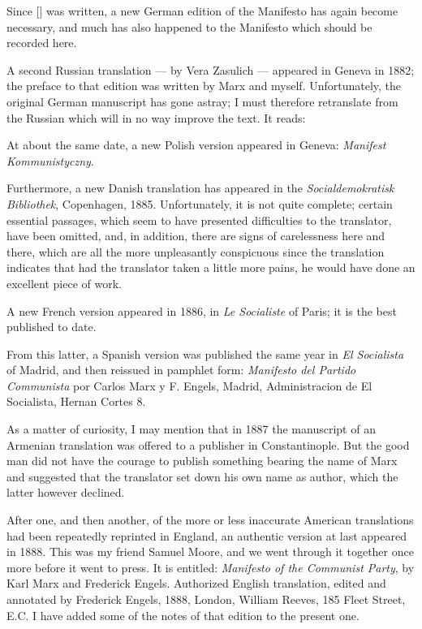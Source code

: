 Since [] was written, a new German edition of the Manifesto has again become necessary, and much has also happened to the Manifesto which should be recorded here. 

A second Russian translation --- by Vera Zasulich --- appeared in Geneva in 1882; the preface to that edition was written by Marx and myself. Unfortunately, the original German manuscript has gone astray; I must therefore retranslate from the Russian which will in no way improve the text. It reads: 
\begin{displayquote}
\end{displayquote}
At about the same date, a new Polish version appeared in Geneva: \emph{Manifest Kommunistyczny}. 

Furthermore, a new Danish translation has appeared in the \emph{Socialdemokratisk Bibliothek}, Copenhagen, 1885. Unfortunately, it is not quite complete; certain essential passages, which seem to have presented difficulties to the translator, have been omitted, and, in addition, there are signs of carelessness here and there, which are all the more unpleasantly conspicuous since the translation indicates that had the translator taken a little more pains, he would have done an excellent piece of work. 

A new French version appeared in 1886, in \emph{Le Socialiste} of Paris; it is the best published to date. 

From this latter, a Spanish version was published the same year in \emph{El Socialista} of Madrid, and then reissued in pamphlet form: \emph{Manifesto del Partido Communista} por Carlos Marx y F. Engels, Madrid, Administracion de El Socialista, Hernan Cortes 8. 

As a matter of curiosity, I may mention that in 1887 the manuscript of an Armenian translation was offered to a publisher in Constantinople. But the good man did not have the courage to publish something bearing the name of Marx and suggested that the translator set down his own name as author, which the latter however declined. 

After one, and then another, of the more or less inaccurate American translations had been repeatedly reprinted in England, an authentic version at last appeared in 1888. This was my friend Samuel Moore, and we went through it together once more before it went to press. It is entitled: \emph{Manifesto of the Communist Party}, by Karl Marx and Frederick Engels. Authorized English translation, edited and annotated by Frederick Engels, 1888, London, William Reeves, 185 Fleet Street, E.C. I have added some of the notes of that edition to the present one. 

